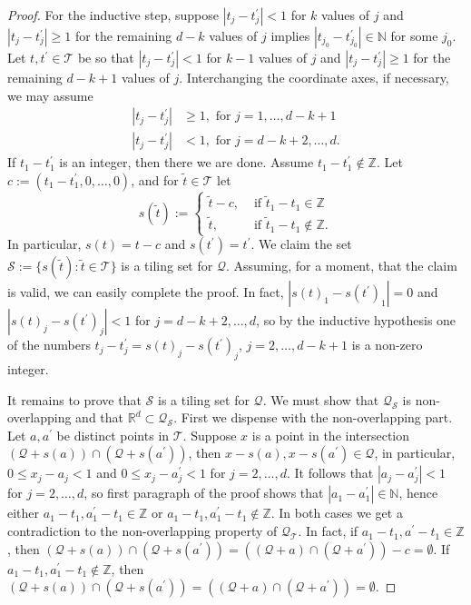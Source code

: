 \documentclass[12pt]{amsart}
\theoremstyle{plain}
\numberwithin{equation}{section}
\newcommand{\Q}{\ensuremath{\mathcal{Q}}\xspace}
\newcommand{\Ss}{\ensuremath{\mathcal{S}}\xspace}
\newcommand{\T}{\ensuremath{\mathcal{T}}\xspace}
\newcommand{\Rd}{\ensuremath{\mathbb{R}^{d}}\xspace}
\newcommand{\N}{\ensuremath{\mathbb{N}}\xspace}
\newcommand{\Z}{\ensuremath{\mathbb{Z}}\xspace}
\begin{document}
\begin{proof}
   For the inductive step,
   suppose $|t_j-t_j^{\prime}|<1$ for $k$ values of $j$ and
   $|t_j-t_j^{\prime}|\geq 1$ for the remaining $d-k$ values of $j$
   implies $|t_{j_0}-t_{j_0}^{\prime}|\in\N$ for some $j_0$. Let
   $t,t^{\prime}\in\T$ be so that $|t_j-t_j^{\prime}|<1$ for $k-1$
   values of $j$ and $|t_j-t_j^{\prime}|\geq 1$ for the remaining
   $d-k+1$ values of $j$. Interchanging the coordinate axes, if
   necessary, we may assume
   \begin{align*}
      |t_j-t_j^{\prime}|&\geq 1,\text{ for } j=1,\ldots,d-k+1 \\
      |t_j-t_j^{\prime}|&<1, \text{ for } j=d-k+2,\ldots,d.
   \end{align*}
   If $t_1-t_1^{\prime}$ is an integer, then there we are done.
   Assume $t_1-t_1^{\prime}\notin\Z$. Let
   $c:=(t_1-t_1^{\prime},0,\ldots,0)$, and
   for $\tilde{t}\in\T$ let
   \begin{equation*}
      s(\tilde{t}):=\begin{cases}
         \tilde{t}-c,
            &\text{ if $\tilde{t}_1-t_1\in\Z$} \\
         \tilde{t},
            &\text{ if $\tilde{t}_1-t_1\notin\Z$}.
            \end{cases}
   \end{equation*}
   In particular, $s(t)=t-c$ and
   $s(t^{\prime})=t^{\prime}$.
   We claim the set $\Ss:=\{s(\tilde{t}):\tilde{t}\in\T\}$ is a
   tiling set for \Q. Assuming, for a moment, that the claim is
   valid,
   we can easily complete the proof.
   In fact,
   $|s(t)_1-s(t^{\prime})_1|=0$ and $|s(t)_j-s(t^{\prime})_j|<1$
   for
   $j=d-k+2,\ldots,d$, so by the inductive hypothesis one of the
   numbers $t_j-t_j^{\prime}=s(t)_j-s(t^{\prime})_j$,
   $j=2,\ldots,d-k+1$ is a non-zero integer.
 
   It remains to prove that $\Ss$ is a tiling set for \Q. We must
   show that $\Q_{\Ss}$ is non-overlapping and that
   $\Rd\subset\Q_{\Ss}$. First we dispense with the non-overlapping
   part. Let $a,a^{\prime}$ be distinct points in \T.
   Suppose $x$ is a point in the intersection
   $(\Q+s(a))\cap(\Q+s(a^{\prime}))$, then
   $x-s(a),x-s(a^{\prime})\in\Q$, in particular, $0\leq x_j-a_j<1$
   and $0\leq x_j-a^{\prime}_j<1$ for $j=2,\ldots,d$. It follows that
   $|a_j-a^{\prime}_j|<1$ for $j=2,\ldots,d$, so first paragraph of
   the proof shows that $|a_1-a^{\prime}_1|\in\N$, hence either
   $a_1-t_1,a_{1}^{\prime}-t_1\in\Z$ or
   $a_1-t_1,a_{1}^{\prime}-t_1\notin\Z$. In both cases we get a
   contradiction to the non-overlapping property of $\Q_{\T}$. In
   fact, if $a_1-t_1,a^{\prime}-t_1\in\Z$, then
   $(\Q+s(a))\cap(\Q+s(a^{\prime}))
   =((\Q+a)\cap(\Q+a^{\prime}))-c=\emptyset$.
   If $a_1-t_1,a_1^{\prime}-t_1\notin\Z$, then
   $(\Q+s(a))\cap(\Q+s(a^{\prime}))
   =((\Q+a)\cap(\Q+a^{\prime}))=\emptyset$.
 

\end{proof}
\end{document}
